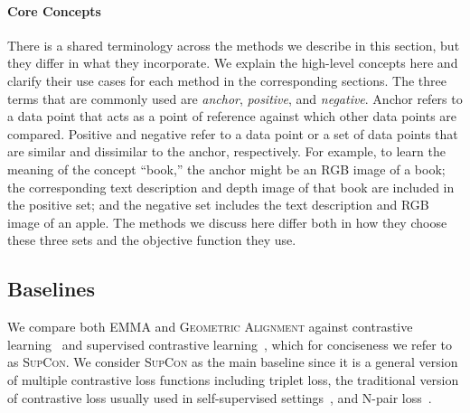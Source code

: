 \documentclass[10pt]{article} %
\newcommand{\ours}{\textsc{EMMA}}
\newcommand{\geom}{\textsc{Geometric Alignment}}
\newcommand{\supcon}{\textsc{SupCon}}
\begin{document}
\paragraph{Core Concepts}
\label{sec:core-concepts}
There is a shared terminology across the methods we describe in this section, but they differ in what they incorporate. We explain the high-level concepts here and clarify their use cases for each method in the corresponding sections.
The three terms that are commonly used are \textit{anchor}, \textit{positive}, and \textit{negative}. Anchor refers to a data point that acts as a point of reference against which other data points are compared. Positive and negative refer to a data point or a set of data points that are similar and dissimilar to the anchor, respectively.
% 
For example, to learn the meaning of the concept ``book,'' the anchor might be an RGB image of a book; the corresponding text description and depth image of that book are included in the positive set; and the negative set includes the text description and RGB image of an apple.
% 
The methods we discuss here differ both in how they choose these three sets and the objective function they use.

\subsection{Baselines}
We compare both \ours{} and \geom{} against contrastive learning~\citep{chen2020simple} and supervised contrastive learning~\citep{NEURIPS2020_supervised_contrastive}, which for conciseness we refer to as \supcon{}.
We consider \supcon{} as the main baseline since it is a general version of multiple contrastive loss functions including triplet loss, the traditional version of contrastive loss usually used in self-supervised settings~\citep{chen2020simple}, and N-pair loss~\citep{NIPS2016N-PairLoss}.
\end{document}
